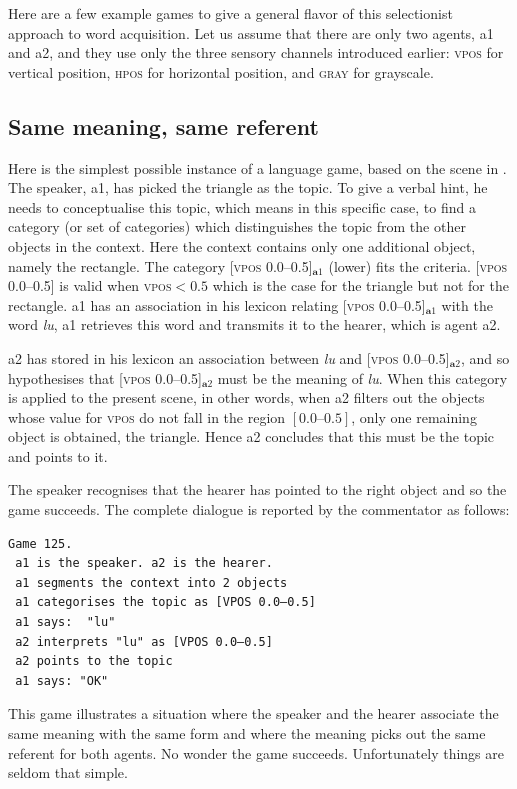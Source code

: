 Here are a few example games to give a general 
flavor of this selectionist approach to word acquisition. 
Let us assume that there are only two 
agents, {\bfshape a1} and {\bfshape a2}, and they use only the 
three sensory channels introduced earlier: \textsc{vpos} for 
vertical position, \textsc{hpos} for horizontal position, and \textsc{gray}
for grayscale. 

\subsection{Same meaning, same referent}

Here is the simplest possible instance of a
language game, based on the scene in . 
The speaker, {\bfshape a1}, has picked the triangle as the topic.
To give a verbal hint, he needs 
to conceptualise this topic, which means in this 
specific case, to find a 
category (or set of categories) which distinguishes the 
topic from the other objects in the context. Here 
the context contains only one additional 
object, namely the rectangle. The category
[\textsc{vpos} 0.0–0.5]$_{\mathbf a1}$ (lower) fits the criteria. 
[\textsc{vpos} 0.0–0.5] is valid when \textsc{vpos}$ < 0.5$
which is the case for the triangle but not for the rectangle. 
{\bfshape a1} has an association in his lexicon 
relating [\textsc{vpos} 0.0–0.5]$_{\mathbf  a1}$ with the word \textit{lu}, 
{\bfshape a1} retrieves this word and transmits it to 
the hearer, which is agent {\bfshape a2}. 

{\bfshape a2} has stored in his lexicon an
association between \textit{lu} and [\textsc{vpos} 0.0–0.5]$_{\mathbf  a2}$, and so
hypothesises that [\textsc{vpos} 0.0–0.5]$_{\mathbf  a2}$ must be the meaning of \textit{lu}. 
When this category is applied to the present scene, in other words,
when {\bfshape a2} filters out the objects whose value for \textsc{vpos} do not 
fall in the region $[0.0–0.5]$, only one 
remaining object is obtained, the triangle. Hence {\bfshape a2} concludes that 
this must be the topic and points to it. 

The speaker recognises that the hearer has pointed
to the right object and so the game succeeds. The complete
dialogue is reported by the commentator as follows: 
\begin{verbatim}
Game 125.
 a1 is the speaker. a2 is the hearer. 
 a1 segments the context into 2 objects
 a1 categorises the topic as [VPOS 0.0–0.5]
 a1 says:  "lu"
 a2 interprets "lu" as [VPOS 0.0–0.5]
 a2 points to the topic 
 a1 says: "OK" 
\end{verbatim}
This game illustrates a situation 
where the speaker and the hearer associate the same meaning
with the same form and where the meaning 
picks out the same referent for both agents. No wonder
the game succeeds. Unfortunately things are seldom that simple. 

